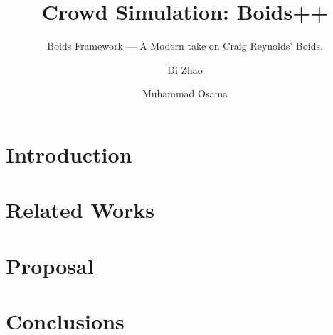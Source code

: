 \documentclass[acmtog]{acmart}
\begin{document}
\title{Crowd Simulation: Boids++}
\subtitle{Boids Framework --- A Modern take on Craig Reynolds' Boids.}

\author{Di Zhao}

\author{Muhammad Osama}

\begin{abstract}

\label{sec:abstract}
\end{abstract}


\maketitle

\section{Introduction}
\label{sec:intro}


\section{Related Works}
\label{sec:related}


\section{Proposal}
\label{sec:proposal}


\section{Conclusions}
\label{sec:conclusions}




\end{document}
